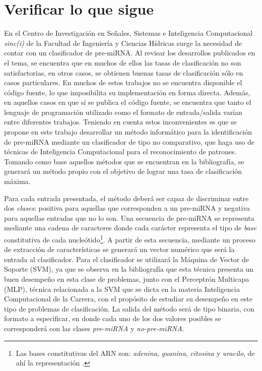 \documentclass[12pt,bibliography=oldstyle,DIV=12,parskip=half-]{scrreprt}
\begin{document}
\section{Verificar lo que sigue}
En el Centro de Investigación en Señales, Sistemas e Inteligencia
Computacional \emph{sinc(i)} de la Facultad de Ingeniería y Ciencias
Hídricas surge la necesidad de contar con un clasificador de
pre-miRNA. Al revisar los desarrollos publicados en el tema, se
encuentra que en muchos de ellos las tasas de clasificación no son
satisfactorias, en otros casos, se obtienen buenas tasas de
clasificación sólo en casos particulares.  En muchos de estos trabajos
no se encuentra disponible el código fuente, lo que imposibilita su
implementación en forma directa.  Además, en aquellos casos en que sí
se publica el código fuente, se encuentra que tanto el lenguaje de
programación utilizado como el formato de entrada/salida varían entre
diferentes trabajos.  Teniendo en cuenta estos inconvenientes es que
se propone en este trabajo desarrollar un método informático para la
identificación de pre-miRNA mediante un clasificador de tipo
no comparativo, que haga uso de técnicas de Inteligencia Computacional
para el reconocimiento de patrones.  Tomando como base aquellos
métodos que se encuentran en la bibliografía, se generará un método
propio con el objetivo de lograr una tasa de clasificación máxima.

Para cada entrada presentada, el método deberá ser capaz de
discriminar entre dos \emph{clases}: positiva para aquellas que
corresponden a un pre-miRNA y negativa para aquellas entradas que no
lo son.  Una secuencia de pre-miRNA se representa mediante una cadena
de caracteres  donde cada carácter representa el
tipo de \emph{base} constitutiva de cada nucleótido\footnote{Las bases
  constitutivas del ARN son: \emph{adenina}, \emph{guanina},
  \emph{citosina} y \emph{uracilo}, de ahí la representación .}.  A partir de esta secuencia, mediante un proceso de
extracción de características se generará un vector numérico que será
la entrada al clasificador.  Para el clasificador se utilizará la
Máquina de Vector de Soporte (SVM), ya que se observa en la
bibliografía que esta técnica presenta un buen desempeño en esta clase
de problemas, junto con el Perceptrón Multicapa (MLP), técnica
relacionada a la SVM \cite{collobert} que se dicta en la materia
Inteligencia Computacional de la Carrera, con el propósito de estudiar
su desempeño en este tipo de problemas de clasificación.  La salida
del método será de tipo binaria, con formato a especificar, en donde
cada uno de los dos valores posibles se corresponderá con las clases
\emph{pre-miRNA} y \emph{no-pre-miRNA}.
\end{document}
